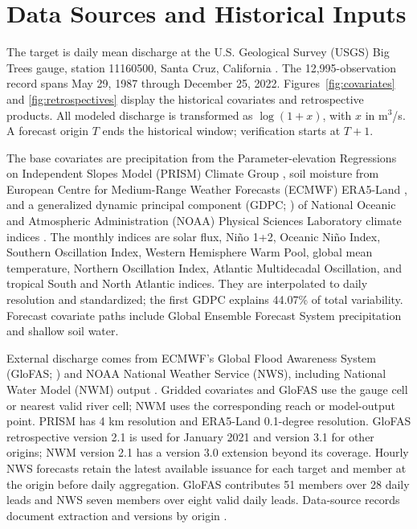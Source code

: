 \section{Data Sources and Historical Inputs}
\label{app:datahistories}

The target is daily mean discharge at the U.S. Geological Survey (USGS) Big Trees gauge, station 11160500, Santa Cruz, California \citep{usgs_daily_11160500}. The 12,995-observation record spans May 29, 1987 through December 25, 2022. Figures~\ref{fig:covariates} and \ref{fig:retrospectives} display the historical covariates and retrospective products. All modeled discharge is transformed as $\log(1+x)$, with $x$ in m$^3$/s. A forecast origin $T$ ends the historical window; verification starts at $T+1$.

The base covariates are precipitation from the Parameter-elevation Regressions on Independent Slopes Model (PRISM) Climate Group \citep{prism}, soil moisture from European Centre for Medium-Range Weather Forecasts (ECMWF) ERA5-Land \citep{ecmwf,munozsabater2021era5land}, and a generalized dynamic principal component (GDPC; \citealp{JSSv092c02}) of National Oceanic and Atmospheric Administration (NOAA) Physical Sciences Laboratory climate indices \citep{noaa_climate_indices}. The monthly indices are solar flux, Ni\~no 1+2, Oceanic Ni\~no Index, Southern Oscillation Index, Western Hemisphere Warm Pool, global mean temperature, Northern Oscillation Index, Atlantic Multidecadal Oscillation, and tropical South and North Atlantic indices. They are interpolated to daily resolution and standardized; the first GDPC explains 44.07\% of total variability. Forecast covariate paths include Global Ensemble Forecast System precipitation and shallow soil water.

External discharge comes from ECMWF's Global Flood Awareness System (GloFAS; \citealp{harrigan2020glofas}) and NOAA National Weather Service (NWS), including National Water Model (NWM) output \citep{cosgrove2024noaa}. Gridded covariates and GloFAS use the gauge cell or nearest valid river cell; NWM uses the corresponding reach or model-output point. PRISM has 4 km resolution and ERA5-Land 0.1-degree resolution. GloFAS retrospective version 2.1 is used for January 2021 and version 3.1 for other origins; NWM version 2.1 has a version 3.0 extension beyond its coverage. Hourly NWS forecasts retain the latest available issuance for each target and member at the origin before daily aggregation. GloFAS contributes 51 members over 28 daily leads and NWS seven members over eight valid daily leads. Data-source records document extraction and versions by origin \citep{deleon2026sanlorenzo_reproducibility}.

